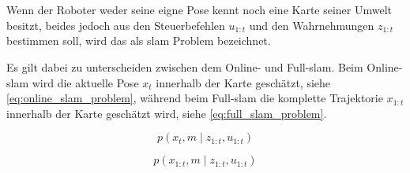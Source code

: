 \section{}
\label{sec:slam}




Wenn der Roboter weder seine eigne Pose kennt noch eine Karte seiner Umwelt besitzt, beides jedoch aus den Steuerbefehlen $u_{1:t}$ und den Wahrnehmungen $z_{1:t}$ bestimmen soll, wird das als \Gls{slam}\footnotemark{} Problem bezeichnet. 


Es gilt dabei zu unterscheiden zwischen dem Online- und Full-\gls{slam}. Beim Online-\gls{slam} wird die aktuelle Pose $x_t$ innerhalb der Karte geschätzt, siehe \autoref{eq:online_slam_problem}, während beim Full-\gls{slam} die komplette Trajektorie $x_{1:t}$ innerhalb der Karte geschätzt wird, siehe \autoref{eq:full_slam_problem}.

\begin{equation}
p(x_t, m \mid z_{1:t}, u_{1:t}) \label{eq:online_slam_problem}
\end{equation}

\begin{equation}
p(x_{1:t}, m \mid z_{1:t}, u_{1:t}) \label{eq:full_slam_problem}
\end{equation}

